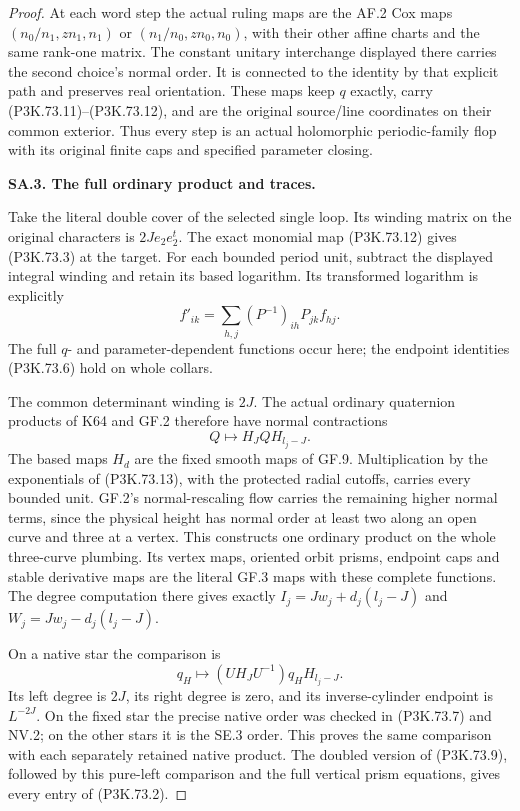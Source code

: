 \begin{proof}
At each word step the actual ruling maps are the AF.2 Cox maps
\((n_0/n_1,zn_1,n_1)\) or \((n_1/n_0,zn_0,n_0)\), with their
other affine charts and the same rank-one matrix. The constant
unitary interchange displayed there carries the second choice's
normal order. It is connected to the identity by that explicit
path and preserves real orientation. These maps keep \(q\)
exactly, carry (P3K.73.11)--(P3K.73.12), and are the original
source/line coordinates on their common exterior. Thus every
step is an actual holomorphic periodic-family flop with its
original finite caps and specified parameter closing.

\par\medskip\noindent\textbf{SA.3. The full ordinary product and traces.}\par\nopagebreak[4]
Take the literal double cover of the selected single loop.
Its winding matrix on the original characters is
\(2Je_2e_2^t\). The exact monomial map
(P3K.73.12) gives (P3K.73.3) at the target. For each bounded
period unit, subtract the displayed integral winding and retain
its based logarithm. Its transformed logarithm is explicitly
\[
 f'_{ik}=\sum_{h,j}(P^{-1})_{ih}P_{jk}f_{hj}.
 \tag{P3K.73.13}
\]
The full \(q\)- and parameter-dependent functions occur here;
the endpoint identities (P3K.73.6) hold on whole collars.

The common determinant winding is \(2J\). The actual ordinary
quaternion products of K64 and GF.2 therefore have normal
contractions
\[
 Q\longmapsto H_J Q H_{l_j-J}.
 \tag{P3K.73.14}
\]
The based maps \(H_d\) are the fixed smooth maps of GF.9.
Multiplication by the exponentials of (P3K.73.13), with the
protected radial cutoffs, carries every bounded unit. GF.2's
normal-rescaling flow carries the remaining higher normal
terms, since the physical height has normal order at least
two along an open curve and three at a vertex. This constructs
one ordinary product on the whole three-curve plumbing. Its
vertex maps, oriented orbit prisms, endpoint caps and stable
derivative maps are the literal GF.3 maps with these complete
functions. The degree computation there gives exactly
\(I_j=Jw_j+d_j(l_j-J)\) and
\(W_j=Jw_j-d_j(l_j-J)\).

On a native star the comparison is
\[
 q_H\longmapsto (UH_JU^{-1})q_H H_{l_j-J}.
 \tag{P3K.73.15}
\]
Its left degree is \(2J\), its right degree is zero, and its
inverse-cylinder endpoint is \(L^{-2J}\). On the fixed star
the precise native order was checked in (P3K.73.7) and NV.2;
on the other stars it is the SE.3 order. This proves the same
comparison with each separately retained native product.
The doubled version of (P3K.73.9), followed by this pure-left
comparison and the full vertical prism equations, gives every
entry of (P3K.73.2).


\end{proof}
